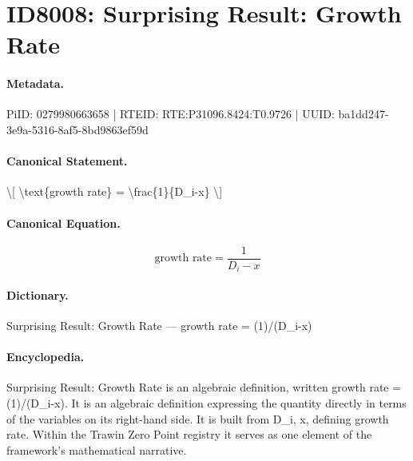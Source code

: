 \section*{ID8008: Surprising Result: Growth Rate}
\paragraph{Metadata.}
PiID: 0279980663658 | RTEID: RTE:P31096.8424:T0.9726 | UUID: ba1dd247-3e9a-5316-8af5-8bd9863ef59d

\paragraph{Canonical Statement.}
\textbackslash{}[ \textbackslash{}text\{growth rate\} = \textbackslash{}frac\{1\}\{D\_i-x\} \textbackslash{}]

\paragraph{Canonical Equation.}
\[
\text{growth rate} = \frac{1}{D_i-x}
\]

\paragraph{Dictionary.}
Surprising Result: Growth Rate — growth rate = (1)/(D\_i-x)

\paragraph{Encyclopedia.}
Surprising Result: Growth Rate is an algebraic definition, written growth rate = (1)/(D\_i-x). It is an algebraic definition expressing the quantity directly in terms of the variables on its right-hand side. It is built from D\_i, x, defining growth rate. Within the Trawin Zero Point registry it serves as one element of the framework's mathematical narrative.
